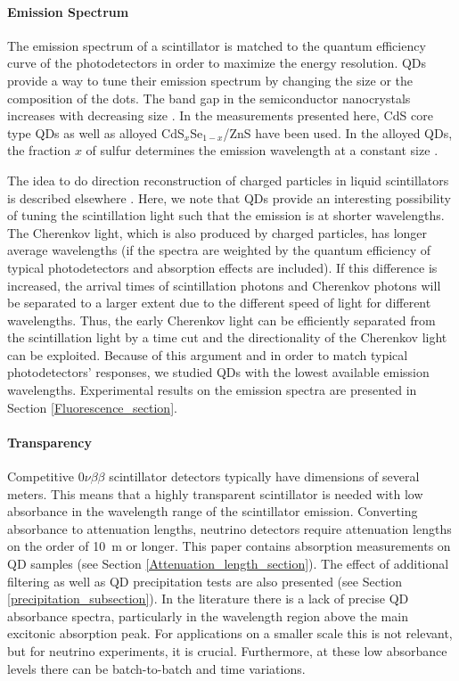 \documentclass[cits]{JINST}
\begin{document}
\paragraph{Emission Spectrum}
The emission spectrum of a scintillator is matched to the quantum efficiency curve of the photodetectors in order to maximize the energy resolution. QDs provide a way to tune their emission spectrum by changing the size or the composition of the dots. The band gap in the semiconductor nanocrystals increases with decreasing size \cite{alivisatos1996}. In the measurements presented here, CdS core type QDs as well as alloyed CdS$_x$Se$_{1-x}$/ZnS have been used. In the alloyed QDs, the fraction $x$ of sulfur determines the emission wavelength at a constant size \cite{swafford2006}. 

The idea to do direction reconstruction of charged particles in liquid scintillators is described elsewhere \cite{mitpaper,simpaper}. Here, we note that QDs provide an interesting possibility of tuning the scintillation light such that the emission is at shorter wavelengths. The Cherenkov light, which is also produced by charged particles, has longer average wavelengths (if the spectra are weighted by the quantum efficiency of typical photodetectors and absorption effects are included). If this difference is increased, the arrival times of scintillation photons and Cherenkov photons will be separated to a larger extent due to the different speed of light for different wavelengths. Thus, the early Cherenkov light can be efficiently separated from the scintillation light by a time cut and the directionality of the Cherenkov light can be exploited. Because of this argument and in order to match typical photodetectors' responses, we studied QDs with the lowest available emission wavelengths. Experimental results on the emission spectra are presented in Section \ref{Fluorescence_section}. 

\paragraph{Transparency}
Competitive 0$\nu\beta\beta$ scintillator detectors typically have dimensions of several meters. This means that a highly transparent scintillator is needed with low absorbance in the wavelength range of the scintillator emission. Converting absorbance to attenuation lengths, neutrino detectors require attenuation lengths on the order of 10~m or longer. This paper contains absorption measurements on QD samples (see Section \ref{Attenuation_length_section}). The effect of additional filtering as well as QD precipitation tests are also presented (see Section \ref{precipitation_subsection}). In the literature there is a lack of precise QD absorbance spectra, particularly in the wavelength region above the main excitonic absorption peak. For applications on a smaller scale this is not relevant, but for neutrino experiments, it is crucial. Furthermore, at these low absorbance levels there can be batch-to-batch and time variations.
\end{document}
